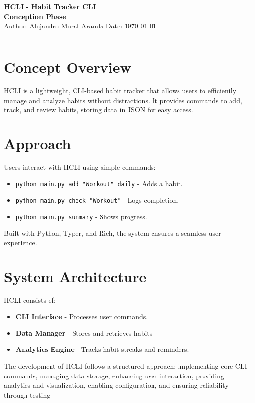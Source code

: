 \documentclass[a4paper,12pt]{article}
\begin{document}
\begin{center}
    {\LARGE \textbf{HCLI - Habit Tracker CLI}}\\[0.5cm]
    {\Large \textbf{Conception Phase}}\\[0.3cm]
    {\small Author: Alejandro Moral Aranda \hspace{1cm} Date: \today}
    \hrule
\end{center}

\section{Concept Overview}
HCLI is a lightweight, CLI-based habit tracker that allows users to efficiently manage and analyze habits without distractions. It provides commands to add, track, and review habits, storing data in JSON for easy access.

\section{Approach}
Users interact with HCLI using simple commands:
\begin{itemize}
    \item \texttt{python main.py add "Workout" daily} - Adds a habit.
    \item \texttt{python main.py check "Workout"} - Logs completion.
    \item \texttt{python main.py summary} - Shows progress.
\end{itemize}
Built with Python, Typer, and Rich, the system ensures a seamless user experience.


\section{System Architecture}
HCLI consists of:
\begin{itemize}
    \item \textbf{CLI Interface} - Processes user commands.
    \item \textbf{Data Manager} - Stores and retrieves habits.
    \item \textbf{Analytics Engine} - Tracks habit streaks and reminders.
\end{itemize}
The development of HCLI follows a structured approach: implementing core CLI commands, managing data storage, enhancing user interaction, providing analytics and visualization, enabling configuration, and ensuring reliability through testing.
\end{document}
